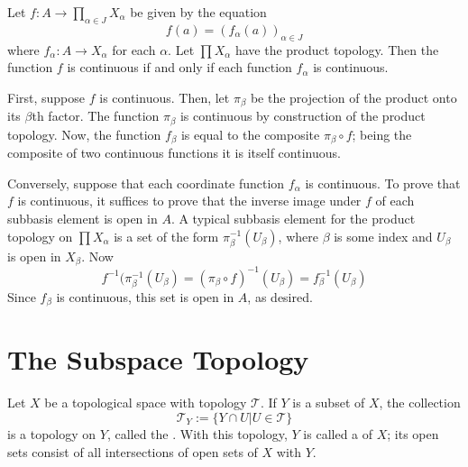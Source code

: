 \documentclass[12pt, a4paper, twoside, openright, titlepage]{book}
\begin{document}
\begin{thm}{}{}
    Let $f:A\rightarrow \prod_{\alpha \in J}X_{\alpha}$ be given by the equation \begin{equation*}
        f(a) = (f_{\alpha}(a))_{\alpha \in J}
    \end{equation*}
    where $f_{\alpha}:A\rightarrow X_{\alpha}$ for each $\alpha$. Let $\prod X_{\alpha}$ have the product topology. Then the function $f$ is continuous if and only if each function $f_{\alpha}$ is continuous.
\end{thm}
\begin{proof*}{}{}
    First, suppose $f$ is continuous. Then, let $\pi_{\beta}$ be the projection of the product onto its $\beta$th factor. The function $\pi_{\beta}$ is continuous by construction of the product topology. Now, the function $f_{\beta}$ is equal to the composite $\pi_{\beta} \circ f$; being the composite of two continuous functions it is itself continuous.

    Conversely, suppose that each coordinate function $f_{\alpha}$ is continuous. To prove that $f$ is continuous, it suffices to prove that the inverse image under $f$ of each subbasis element is open in $A$. A typical subbasis element for the product topology on $\prod X_{\alpha}$ is a set of the form $\pi^{-1}_{\beta}(U_{\beta})$, where $\beta$ is some index and $U_{\beta}$ is open in $X_{\beta}$. Now \begin{equation*}
        f^{-1}(\pi_{\beta}^{-1}(U_{\beta}) = (\pi_{\beta}\circ f)^{-1}(U_{\beta}) = f_{\beta}^{-1}(U_{\beta})
    \end{equation*}
    Since $f_{\beta}$ is continuous, this set is open in $A$, as desired.
\end{proof*}




\section{The Subspace Topology}

\begin{defn}{}{}
    Let $X$ be a topological space with topology $\mathcal{T}$. If $Y$ is a subset of $X$, the collection \begin{equation*}
        \mathcal{T}_Y :=\{Y\cap U\vert U \in \mathcal{T}\}
    \end{equation*}
    is a topology on $Y$, called the . With this topology, $Y$ is called a  of $X$; its open sets consist of all intersections of open sets of $X$ with $Y$.
\end{defn}
\end{document}
